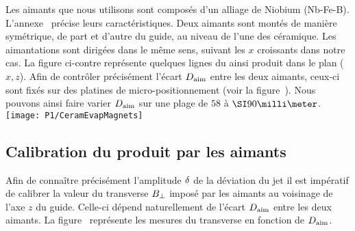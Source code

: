 Les aimants que nous utilisons sont composés d'un alliage de Niobium (Nb-Fe-B). L'annexe~ précise leurs caractéristiques. Deux aimants sont montés de manière symétrique, de part et d'autre du guide, au niveau de l'une des céramique. Les aimantations sont dirigées dans le même sens, suivant les $x$ croissants dans notre cas. La figure ci-contre représente quelques lignes du \chm ainsi produit dans le plan ($x,z$).
\noindent Afin de contrôler précisément l'écart ${D_{\rm aim}}$ entre les deux aimants, ceux-ci sont fixés sur des platines de micro-positionnement (voir la figure~). 
Nous pouvons ainsi faire varier ${D_{\rm aim}}$ sur une plage de $58$ à $\mm{90}$. 
%
\bfigh
\RemonteUnPeuFig
{\texttt{[image: P1/CeramEvapMagnets]}}
\RemonteUnPeuFig
{}
\label{fig:EvapMagnet}
\efigh

{\AjouteLigne}

\subsection{Calibration du \chm produit par les aimants}
Afin de connaître précisément l'amplitude ${\delta}$ de la déviation du jet il est impératif de calibrer la valeur du \chm transverse ${B_{\rm \bot}}$ imposé par les aimants au voisinage de l'axe $z$ du guide.
Celle-ci dépend naturellement de l'écart ${D_{\rm aim}}$ entre les deux aimants. La figure~ représente les mesures du \chm transverse 
en fonction de ${D_{\rm aim}}$. 
\bfighsss
{}\,\,\,\,\,\,
\label{fig:CeramAimantChamp}
\efigh


